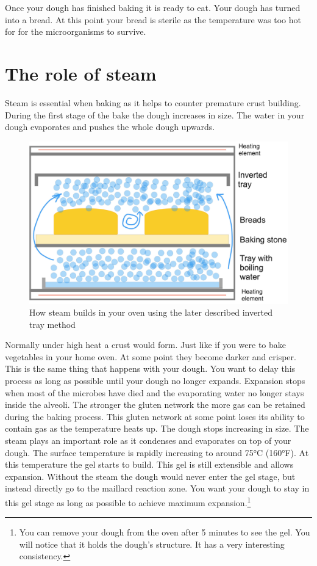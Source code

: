 Once your dough has finished baking it is ready to eat. Your
dough has turned into a bread. At this
point your bread is sterile as the temperature was too hot for
for the microorganisms to survive.

\section{The role of steam}

Steam is essential when baking as it helps to counter premature
crust building. During the first stage of the bake the dough
increases in size. The water in your dough evaporates and pushes
the whole dough upwards. 

\begin{figure}[!htb]
  \includegraphics[width=\textwidth]{baking-process-steam.jpg}
  \caption{How steam builds in your oven using the later described
  inverted tray method}
\end{figure}

Normally under high heat a crust would form. Just like
if you were to bake vegetables in your home oven. At some point
they become darker and crisper. This is the same thing that
happens with your dough. You want to delay this process
as long as possible until your dough no longer expands.
Expansion stops when most of the microbes have died and
the evaporating water no longer stays inside the alveoli.
The stronger the gluten network the more gas can be retained
during the baking process. This gluten network at some point
loses its ability to contain gas as the temperature heats
up. The dough stops increasing in size. The steam plays
an important role as it condenses and evaporates on top
of your dough. The surface temperature is rapidly increasing
to around 75°C (160°F). At this temperature the gel starts
to build. This gel is still extensible and allows expansion.
Without the steam the dough would never enter the gel stage,
but instead directly go to the maillard reaction zone. You
want your dough to stay in this gel stage as long as possible
to achieve maximum expansion.\footnote{You can remove your
dough from the oven after 5 minutes to see the gel. You will notice
that it holds the dough's structure. It has a very interesting consistency.}

